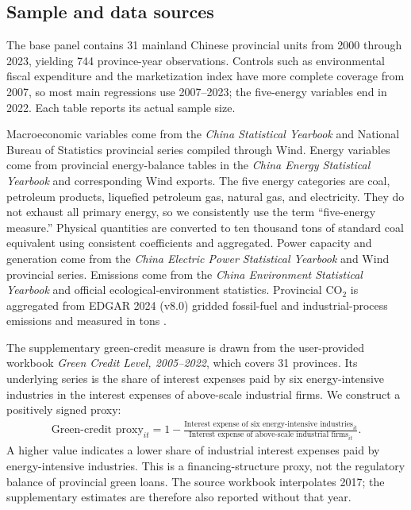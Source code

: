 \documentclass[11pt]{article}
\begin{document}
\subsection{Sample and data sources}

The base panel contains 31 mainland Chinese provincial units from 2000 through 2023, yielding 744 province-year observations. Controls such as environmental fiscal expenditure and the marketization index have more complete coverage from 2007, so most main regressions use 2007--2023; the five-energy variables end in 2022. Each table reports its actual sample size.

Macroeconomic variables come from the \emph{China Statistical Yearbook} and National Bureau of Statistics provincial series compiled through Wind. Energy variables come from provincial energy-balance tables in the \emph{China Energy Statistical Yearbook} and corresponding Wind exports. The five energy categories are coal, petroleum products, liquefied petroleum gas, natural gas, and electricity. They do not exhaust all primary energy, so we consistently use the term ``five-energy measure.'' Physical quantities are converted to ten thousand tons of standard coal equivalent using consistent coefficients and aggregated. Power capacity and generation come from the \emph{China Electric Power Statistical Yearbook} and Wind provincial series. Emissions come from the \emph{China Environment Statistical Yearbook} and official ecological-environment statistics. Provincial CO$_2$ is aggregated from EDGAR 2024 (v8.0) gridded fossil-fuel and industrial-process emissions and measured in tons \parencite{crippaetal2024}.

The supplementary green-credit measure is drawn from the user-provided workbook \emph{Green Credit Level, 2005--2022}, which covers 31 provinces. Its underlying series is the share of interest expenses paid by six energy-intensive industries in the interest expenses of above-scale industrial firms. We construct a positively signed proxy:
\begin{equation}
\begin{aligned}
\text{Green-credit proxy}_{it}
=1-\frac{\text{Interest expense of six energy-intensive industries}_{it}}
{\text{Interest expense of above-scale industrial firms}_{it}}.
\end{aligned}
\end{equation}
A higher value indicates a lower share of industrial interest expenses paid by energy-intensive industries. This is a financing-structure proxy, not the regulatory balance of provincial green loans. The source workbook interpolates 2017; the supplementary estimates are therefore also reported without that year.
\end{document}

